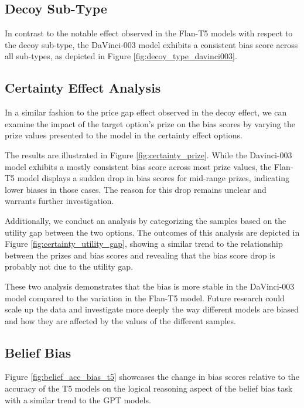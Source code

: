 \subsection{Decoy Sub-Type}
\label{appendix:subsec:decoy_type_davinci003}

In contrast to the notable effect observed in the Flan-T5 models with respect to the decoy sub-type, the DaVinci-003 model exhibits a consistent bias score across all sub-types, as depicted in Figure \ref{fig:decoy_type_davinci003}.


\subsection{Certainty Effect Analysis}
\label{appendix:subsec:certainty_analysis}
In a similar fashion to the price gap effect observed in the decoy effect, we can examine the impact of the target option's prize on the bias scores by varying the prize values presented to the model in the certainty effect options.

The results are illustrated in Figure \ref{fig:certainty_prize}.
While the Davinci-003 model exhibits a mostly consistent bias score across most prize values, the Flan-T5 model displays a sudden drop in bias scores for mid-range prizes, indicating lower biases in those cases.
The reason for this drop remains unclear and warrants further investigation.

Additionally, we conduct an analysis by categorizing the samples based on the utility gap between the two options.
The outcomes of this analysis are depicted in Figure \ref{fig:certainty_utility_gap}, showing a similar trend to the relationship between the prizes and bias scores and revealing that the bias score drop is probably not due to the utility gap.

These two analysis demonstrates that the bias is more stable in the DaVinci-003 model compared to the variation in the Flan-T5 model.
Future research could scale up the data and investigate more deeply the way different models are biased and how they are affected by the values of the different samples.







\subsection{Belief Bias}
\label{appendix:subsec:belief_acc_bias_t5}


Figure \ref{fig:belief_acc_bias_t5} showcases the change in bias scores relative to the accuracy of the T5 models on the logical reasoning aspect of the belief bias task with a similar trend to the GPT models.
